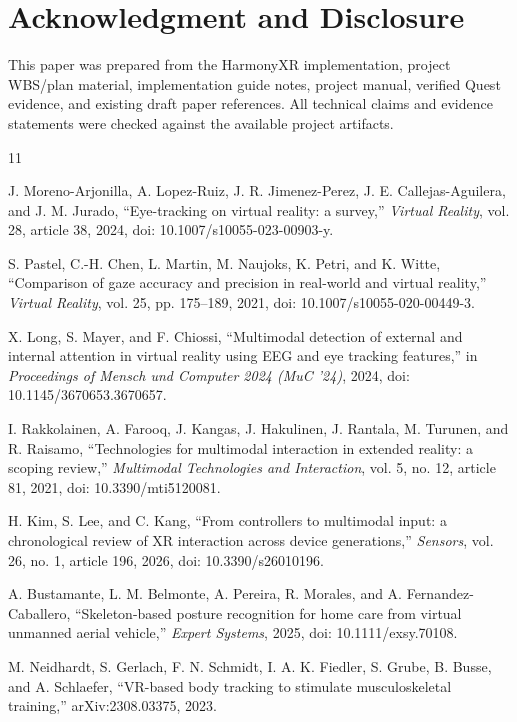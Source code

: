 \documentclass[conference]{IEEEtran}
\begin{document}
\section*{Acknowledgment and Disclosure}
This paper was prepared from the HarmonyXR implementation, project WBS/plan material, implementation guide notes, project manual, verified Quest evidence, and existing draft paper references. All technical claims and evidence statements were checked against the available project artifacts.

\begin{thebibliography}{11}

J. Moreno-Arjonilla, A. Lopez-Ruiz, J. R. Jimenez-Perez, J. E. Callejas-Aguilera, and J. M. Jurado, ``Eye-tracking on virtual reality: a survey,'' \emph{Virtual Reality}, vol. 28, article 38, 2024, doi: 10.1007/s10055-023-00903-y.

S. Pastel, C.-H. Chen, L. Martin, M. Naujoks, K. Petri, and K. Witte, ``Comparison of gaze accuracy and precision in real-world and virtual reality,'' \emph{Virtual Reality}, vol. 25, pp. 175--189, 2021, doi: 10.1007/s10055-020-00449-3.

X. Long, S. Mayer, and F. Chiossi, ``Multimodal detection of external and internal attention in virtual reality using EEG and eye tracking features,'' in \emph{Proceedings of Mensch und Computer 2024 (MuC '24)}, 2024, doi: 10.1145/3670653.3670657.

I. Rakkolainen, A. Farooq, J. Kangas, J. Hakulinen, J. Rantala, M. Turunen, and R. Raisamo, ``Technologies for multimodal interaction in extended reality: a scoping review,'' \emph{Multimodal Technologies and Interaction}, vol. 5, no. 12, article 81, 2021, doi: 10.3390/mti5120081.

H. Kim, S. Lee, and C. Kang, ``From controllers to multimodal input: a chronological review of XR interaction across device generations,'' \emph{Sensors}, vol. 26, no. 1, article 196, 2026, doi: 10.3390/s26010196.

A. Bustamante, L. M. Belmonte, A. Pereira, R. Morales, and A. Fernandez-Caballero, ``Skeleton-based posture recognition for home care from virtual unmanned aerial vehicle,'' \emph{Expert Systems}, 2025, doi: 10.1111/exsy.70108.

M. Neidhardt, S. Gerlach, F. N. Schmidt, I. A. K. Fiedler, S. Grube, B. Busse, and A. Schlaefer, ``VR-based body tracking to stimulate musculoskeletal training,'' arXiv:2308.03375, 2023.


\end{thebibliography}
\end{document}
